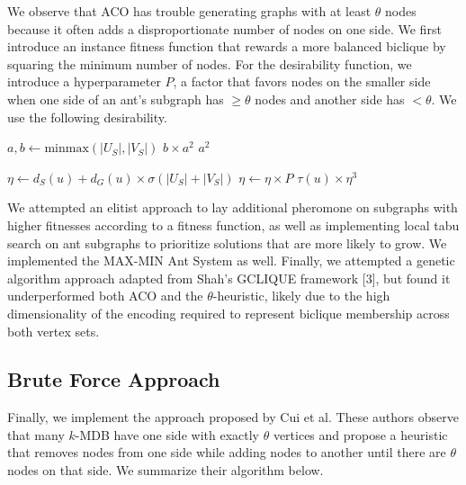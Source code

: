 \documentclass{article}
\begin{document}
We observe that ACO has trouble generating graphs with at least $\theta$ nodes because it often adds a disproportionate number of nodes on one side. We first introduce an instance fitness function that rewards a more balanced biclique by squaring the minimum number of nodes. For the desirability function, we introduce a hyperparameter $P$, a factor that favors nodes on the smaller side when one side of an ant's subgraph has $\geq \theta$ nodes and another side has $< \theta$. We use the following desirability.

\begin{algorithm}[H]
\caption{Prefer-Smaller-Side Desirability}
\begin{minipage}{\textwidth}
\begin{algorithmic}

    \State $a, b \gets \text{minmax}(|U_S|, |V_S|)$
        \State \Return $b \times a^2$
    \Else
        \State \Return $a^2$
    \EndIf
\EndFunction

    \State $\eta \gets d_S(u) + d_G(u) \times \sigma(|U_S| + |V_S|)$
        \State $\eta \gets \eta \times P$ 
    \EndIf
    \State \Return $\tau(u) \times \eta^3$
\EndFunction

\end{algorithmic}
\end{minipage}
\end{algorithm}

We attempted an elitist approach to lay additional pheromone on subgraphs with higher fitnesses according to a fitness function, as well as implementing local tabu search on ant subgraphs to prioritize solutions that are more likely to grow. We implemented the MAX-MIN Ant System as well. Finally, we attempted a genetic algorithm approach adapted from Shah's GCLIQUE framework [3], but found it underperformed both ACO and the $\theta$-heuristic, likely due to the high dimensionality of the encoding required to represent biclique membership across both vertex sets. 

\subsection{Brute Force Approach}

Finally, we implement the approach proposed by Cui et al. These authors observe that many $k$-MDB have one side with exactly $\theta$ vertices and propose a heuristic that removes nodes from one side while adding nodes to another until there are $\theta$ nodes on that side. We summarize their algorithm below.
\end{document}
